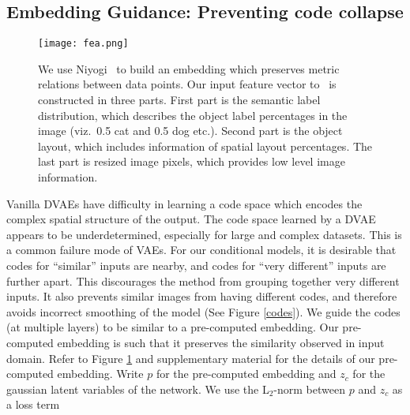 \documentclass[10pt,twocolumn,letterpaper]{article}
\begin{document}


\subsection{Embedding Guidance: Preventing code collapse}
\label{sec:embed}

\begin{figure}[!t]
\centerline{  \texttt{[image: fea.png]}}
  \caption{We use Niyogi~\cite{niyogi2004locality} to build an embedding which 
   preserves metric relations between data points. Our input feature vector to~\cite{niyogi2004locality} 
   is constructed in three parts. First part is the semantic label distribution, which describes the 
   object label percentages in the image (viz.\ 0.5 cat and 0.5 dog etc.). Second part is the object 
   layout, which includes information of spatial layout percentages. The last part is resized 
   image pixels, which provides low level image information.}
  \label{fig:fea}
\end{figure}


Vanilla DVAEs have difficulty in learning a code space which encodes the complex spatial 
structure of the output. The code space learned by a DVAE appears to be underdetermined, 
especially for large and complex datasets. This is a common failure mode of VAEs. 
For our conditional models, it is desirable that codes for ``similar'' inputs are nearby, 
and codes for ``very different'' inputs are further apart. This discourages the method 
from grouping together very different inputs. It also prevents similar images from
having different codes, and therefore avoids incorrect smoothing of the model (See 
Figure \ref{codes}). We guide the codes (at multiple layers) to be similar to a pre-computed 
embedding. Our pre-computed embedding is such that it preserves the similarity observed in 
input domain. Refer to Figure \ref{fig:fea} and supplementary material for the details 
of our pre-computed embedding. Write $p$ for the pre-computed embedding and $z_c$ for the gaussian latent 
variables of the network. We use the L$_{2}$-norm between $p$ and $z_c$ as a loss term
\end{document}
